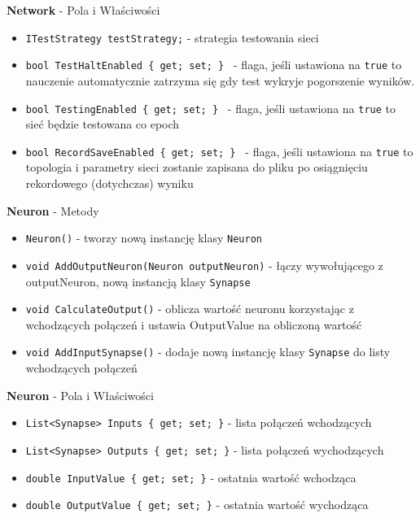 \documentclass[12pt,a4paper]{article}
\begin{document}
    
    \textbf{Network} - Pola i Właściwości
    \begin{itemize}
        \item \lstinline{ITestStrategy testStrategy;} - strategia testowania sieci
        \item \lstinline|bool TestHaltEnabled { get; set; } | %
        - flaga, jeśli ustawiona na \lstinline{true} to nauczenie automatycznie zatrzyma się gdy test wykryje pogorszenie wyników.
        \item \lstinline|bool TestingEnabled { get; set; } | - flaga, jeśli ustawiona na \lstinline{true} to sieć będzie testowana co epoch
        \item \lstinline|bool RecordSaveEnabled { get; set; } | - flaga, jeśli ustawiona na \lstinline{true} to topologia i parametry sieci zostanie zapisana do pliku po osiągnięciu rekordowego (dotychczas) wyniku
    \end{itemize}
    
    \textbf{Neuron} - Metody
    \begin{itemize}
        \item \lstinline{Neuron()} - tworzy nową instancję klasy \lstinline{Neuron}
        \item \lstinline{void AddOutputNeuron(Neuron outputNeuron)} - łączy wywołującego z outputNeuron, nową instancją klasy \lstinline{Synapse}
        \item \lstinline{void CalculateOutput()} - oblicza wartość neuronu korzystając z wchodzących połączeń i ustawia OutputValue na obliczoną wartość
        \item \lstinline{void AddInputSynapse()} - dodaje nową instancję klasy \lstinline{Synapse} do listy wchodzących połączeń
    \end{itemize}
    
    \textbf{Neuron} - Pola i Właściwości
    \begin{itemize}
        \item \lstinline|List<Synapse> Inputs { get; set; }| - lista połączeń wchodzących
        \item \lstinline|List<Synapse> Outputs { get; set; }| - lista połączeń wychodzących
        \item \lstinline|double InputValue { get; set; }| - ostatnia wartość wchodząca
        \item \lstinline|double OutputValue { get; set; }| - ostatnia wartość wychodząca 
    \end{itemize}
    
\end{document}
